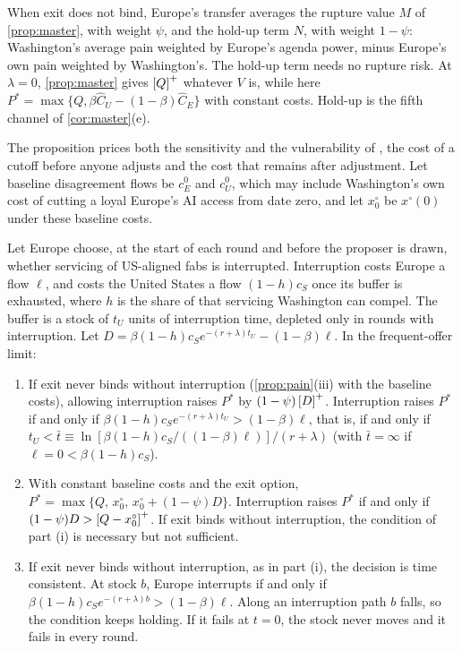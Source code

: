 When exit does not bind, Europe's transfer averages the rupture value $M$ of \cref{prop:master}, with weight $\psi$, and the hold-up term $N$, with weight $1-\psi$: Washington's average pain weighted by Europe's agenda power, minus Europe's own pain weighted by Washington's. The hold-up term needs no rupture risk. At $\lambda=0$, \cref{prop:master} gives $\left[Q\right]^{+}$ whatever $V$ is, while here $P^*=\max\{Q,\beta\hat C_U-(1-\beta)\hat C_E\}$ with constant costs. Hold-up is the fifth channel of \cref{cor:master}(e).

The proposition prices both the sensitivity and the vulnerability of \citet{keohane1977power}, the cost of a cutoff before anyone adjusts and the cost that remains after adjustment. Let baseline disagreement flows be $c_E^0$ and $c_U^0$, which may include Washington's own cost of cutting a loyal Europe's AI access from date zero, and let $x^\circ_0$ be $x^\circ(0)$ under these baseline costs.

\begin{corollary}[Interruption]\label{cor:interrupt}
Let Europe choose, at the start of each round and before the proposer is drawn, whether servicing of US-aligned fabs is interrupted. Interruption costs Europe a flow $\ell$, and costs the United States a flow $(1-h)c_S$ once its buffer is exhausted, where $h$ is the share of that servicing Washington can compel. The buffer is a stock of $t_U$ units of interruption time, depleted only in rounds with interruption. Let $D=\beta(1-h)c_Se^{-(r+\lambda)t_U}-(1-\beta)\ell$. In the frequent-offer limit:
\begin{enumerate}[label=(\roman*)]
\item If exit never binds without interruption (\cref{prop:pain}(iii) with the baseline costs), allowing interruption raises $P^*$ by $(1-\psi)\left[D\right]^{+}$. Interruption raises $P^*$ if and only if $\beta(1-h)c_Se^{-(r+\lambda)t_U}>(1-\beta)\ell$, that is, if and only if $t_U<\bar t\equiv\ln[\beta(1-h)c_S/((1-\beta)\ell)]/(r+\lambda)$ (with $\bar t=\infty$ if $\ell=0<\beta(1-h)c_S$).
\item With constant baseline costs and the exit option, $P^*=\max\{Q,\,x^\circ_0,\,x^\circ_0+(1-\psi)D\}$. Interruption raises $P^*$ if and only if $(1-\psi)D>\left[Q-x^\circ_0\right]^{+}$. If exit binds without interruption, the condition of part (i) is necessary but not sufficient.
\item If exit never binds without interruption, as in part (i), the decision is time consistent. At stock $b$, Europe interrupts if and only if $\beta(1-h)c_Se^{-(r+\lambda)b}>(1-\beta)\ell$. Along an interruption path $b$ falls, so the condition keeps holding. If it fails at $t=0$, the stock never moves and it fails in every round.
\end{enumerate}
\end{corollary}

